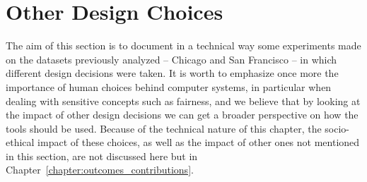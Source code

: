 \section{Other Design Choices}
The aim of this section is to document in a technical way some experiments made on the datasets previously analyzed -- Chicago and San Francisco -- in which different design decisions were taken. It is worth to emphasize once more the importance of human choices behind computer systems, in particular when dealing with sensitive concepts such as fairness, and we believe that by looking at the impact of other design decisions we can get a broader perspective on how the tools should be used.
Because of the technical nature of this chapter, the socio-ethical impact of these choices, as well as the impact of other ones not mentioned in this section, are not discussed here but in Chapter~\ref{chapter:outcomes_contributions}.


